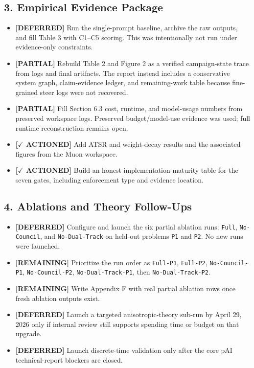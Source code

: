 \documentclass[11pt]{article}
\newcommand{\actioned}{\textbf{\textcolor{green!45!black}{[$\checkmark$ ACTIONED]}}}
\newcommand{\partialdone}{\textbf{\textcolor{orange!75!black}{[PARTIAL]}}}
\newcommand{\remaining}{\textbf{\textcolor{red!65!black}{[REMAINING]}}}
\newcommand{\deferred}{\textbf{\textcolor{blue!65!black}{[DEFERRED]}}}
\begin{document}
\subsection*{3. Empirical Evidence Package}
\begin{itemize}
  \item \deferred{} Run the single-prompt baseline, archive the raw outputs, and fill Table 3 with C1--C5 scoring. This was intentionally not run under evidence-only constraints.
  \item \partialdone{} Rebuild Table 2 and Figure 2 as a verified campaign-state trace from logs and final artifacts. The report instead includes a conservative system graph, claim-evidence ledger, and remaining-work table because fine-grained steer logs were not recovered.
  \item \partialdone{} Fill Section 6.3 cost, runtime, and model-usage numbers from preserved workspace logs. Preserved budget/model-use evidence was used; full runtime reconstruction remains open.
  \item \actioned{} Add ATSR and weight-decay results and the associated figures from the Muon workspace.
  \item \actioned{} Build an honest implementation-maturity table for the seven gates, including enforcement type and evidence location.
\end{itemize}

\subsection*{4. Ablations and Theory Follow-Ups}
\begin{itemize}
  \item \deferred{} Configure and launch the six partial ablation runs: \texttt{Full}, \texttt{No-Council}, and \texttt{No-Dual-Track} on held-out problems \texttt{P1} and \texttt{P2}. No new runs were launched.
  \item \remaining{} Prioritize the run order as \texttt{Full-P1}, \texttt{Full-P2}, \texttt{No-Council-P1}, \texttt{No-Council-P2}, \texttt{No-Dual-Track-P1}, then \texttt{No-Dual-Track-P2}.
  \item \remaining{} Write Appendix F with real partial ablation rows once fresh ablation outputs exist.
  \item \deferred{} Launch a targeted anisotropic-theory sub-run by April 29, 2026 only if internal review still supports spending time or budget on that upgrade.
  \item \deferred{} Launch discrete-time validation only after the core pAI technical-report blockers are closed.
\end{itemize}
\end{document}
